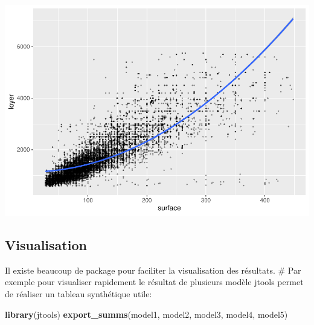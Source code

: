 \documentclass[
]{book}
\newenvironment{Shaded}{\begin{snugshade}}{\end{snugshade}}
\newcommand{\FunctionTok}[1]{\textcolor[rgb]{0.13,0.29,0.53}{\textbf{#1}}}
\newcommand{\NormalTok}[1]{#1}
\begin{document}
\includegraphics{manuel_geo_quanti_files/figure-latex/unnamed-chunk-17-1.pdf}

\hypertarget{visualisation}{%
\subsection{Visualisation}\label{visualisation}}

Il existe beaucoup de package pour faciliter la visualisation des
résultats. \# Par exemple pour visualiser rapidement le résultat de
plusieurs modèle jtools permet de réaliser un tableau synthétique utile:

\begin{Shaded}
\begin{Highlighting}[]
\FunctionTok{library}\NormalTok{(jtools)}
\FunctionTok{export\_summs}\NormalTok{(model1, model2, model3, model4, model5)}
\end{Highlighting}
\end{Shaded}

 
  \providecommand{\huxb}[2]{\arrayrulecolor[RGB]{#1}\global\arrayrulewidth=#2pt}
  \providecommand{\huxvb}[2]{\color[RGB]{#1}\vrule width #2pt}
  \providecommand{\huxtpad}[1]{\rule{0pt}{#1}}
  \providecommand{\huxbpad}[1]{\rule[-#1]{0pt}{#1}}
\end{document}
